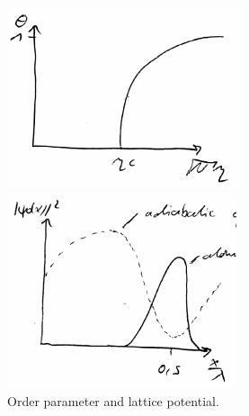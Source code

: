 \begin{figure}[!htb]
	\begin{minipage}[b]{.5\linewidth}
	\centering
	\includegraphics[width=1\linewidth]{images/order_parameter.png}
	\end{minipage}
%
	\begin{minipage}[b]{.5\linewidth}
	\centering
	\includegraphics[width=1\linewidth]{images/lattice_potential.png}
	\end{minipage}
\caption{Order parameter and lattice potential.}
\label{fig:self-organization}
\end{figure}
\FloatBarrier